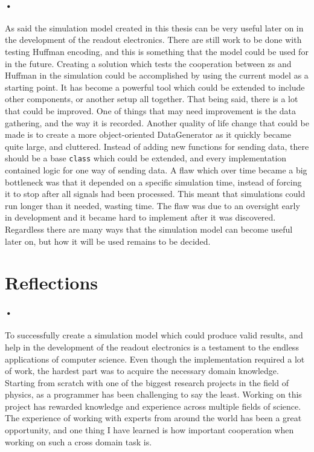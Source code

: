 \documentclass[a4paper, 12pt, openright, twoside]{report}
\newcommand{\codeword}[1]{\texttt{#1}}
\begin{document}
\paragraph{•}
As said the simulation model created in this thesis can be very useful later on in the development of the readout electronics.
There are still work to be done with testing Huffman encoding, and this is something that the model could be used for in the future.
Creating a solution which tests the cooperation between \gls{zs} and Huffman in the simulation could be accomplished by using the current model as a starting point.
It has become a powerful tool which could be extended to include other components, or another setup all together.
That being said, there is a lot that could be improved.
One of things that may need improvement is the data gathering, and the way it is recorded.
Another quality of life change that could be made is to create a more object-oriented DataGenerator as it quickly became quite large, and cluttered.
Instead of adding new functions for sending data, there should be a base \codeword{class} which could be extended, and every implementation contained logic for one way of sending data.
A flaw which over time became a big bottleneck was that it depended on a specific simulation time, instead of forcing it to stop after all signals had been processed.
This meant that simulations could run longer than it needed, wasting time.
The flaw was due to an oversight early in development and it became hard to implement after it was discovered.
Regardless there are many ways that the simulation model can become useful later on, but how it will be used remains to be decided.

\section{Reflections}

\paragraph{•}
To successfully create a simulation model which could produce valid results, and help in the development of the readout electronics is a testament to the endless applications of computer science.
Even though the implementation required a lot of work, the hardest part was to acquire the necessary domain knowledge.
Starting from scratch with one of the biggest research projects in the field of physics, as a programmer has been challenging to say the least.
Working on this project has rewarded knowledge and experience across multiple fields of science.
The experience of working with experts from around the world has been a great opportunity, and one thing I have learned is how important cooperation when working on such a cross domain task is.
\end{document}
